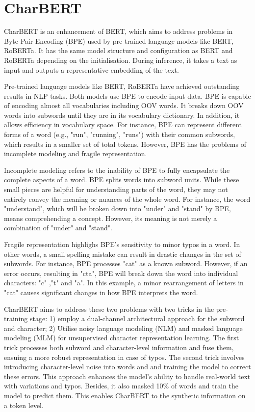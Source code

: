 \section{CharBERT}
\label{sec:2_charbert}
CharBERT \citep{ma2020charbert} is an enhancement of BERT, which aims to address problems in Byte-Pair Encoding (BPE) used by pre-trained language models like BERT, RoBERTa. It has the same model structure and configuration as BERT and RoBERTa depending on the initialisation. During inference, it takes a text as input and outputs a representative embedding of the text.

Pre-trained language models like BERT, RoBERTa have achieved outstanding results in NLP tasks. Both models use BPE to encode input data. BPE is capable of encoding almost all vocabularies including OOV words. It breaks down OOV words into subwords until they are in its vocabulary dictionary. In addition, it allows efficiency in vocabulary space. For instance, BPE can represent different forms of a word (e.g., "run", "running", "runs") with their common subwords, which results in a smaller set of total tokens. However, BPE has the problems of incomplete modeling and fragile representation. 

Incomplete modeling refers to the inability of BPE to fully encapsulate the complete aspects of a word. BPE splits words into subword units. While these small pieces are helpful for understanding parts of the word, they may not entirely convey the meaning or nuances of the whole word. For instance, the word "understand", which will be broken down into "under" and "stand" by BPE, means comprehending a concept. However, its meaning is not merely a combination of "under" and "stand". 

Fragile representation highlighs BPE's sensitivity to minor typos in a word. In other words, a small spelling mistake can result in drastic changes in the set of subwords. For instance, BPE processes "cat" as a known subword. However, if an error occurs, resulting in "cta", BPE will break down the word into individual characters: "c" ,"t" and "a". In this example, a minor rearrangement of letters in "cat" causes significant changes in how BPE interprets the word.

CharBERT aims to address these two problems with two tricks in the pre-training stage: 1) employ a dual-channel architectural approach for the subword and character; 2) Utilise noisy language modeling (NLM) and masked language modeling (MLM) for unsupervised character representation learning. The first trick processes both subword and character-level information and fuse them, ensuing a more robust representation in case of typos. The second trick involves introducing character-level noise into words and and training the model to correct these errors. This approach enhances the model's ability to handle real-world text with variations and typos. Besides, it also masked 10\% of words and train the model to predict them. This enables CharBERT to the synthetic information on a token level.

